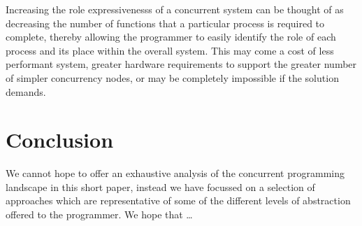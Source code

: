 \documentclass{sig-alternate}
\begin{document}
Increasing the role expressivenesss of a concurrent system can be thought of as decreasing the number of functions that a particular process is required to complete, thereby allowing the programmer to easily identify the role of each process and its place within the overall system. This may come a cost of less performant system, greater hardware requirements to support the greater number of simpler concurrency nodes, or may be completely impossible if the solution demands. 


\section{Conclusion}

We cannot hope to offer an exhaustive analysis of the concurrent programming landscape in this short paper, instead we have focussed on a selection of approaches which are representative of some of the different levels of abstraction offered to the programmer. We hope that \ldots





\end{document}
